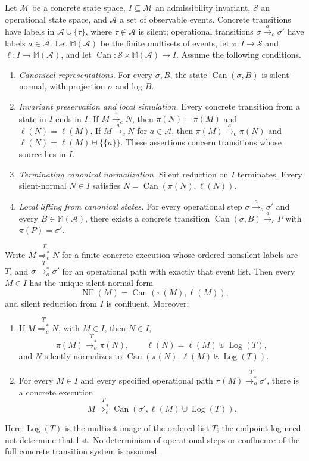 \begin{adequacyprinciple}
Let $\mathcal M$ be a concrete state space, $I\subseteq\mathcal M$ an
admissibility invariant, $\mathcal S$ an operational state space, and
$\mathcal A$ a set of observable events. Concrete transitions have labels
in $\mathcal A\cup\{\tau\}$, where $\tau\notin\mathcal A$ is silent;
operational transitions $\sigma\xrightarrow{a}_o\sigma'$ have labels
$a\in\mathcal A$. Let $\mathbb M(\mathcal A)$ be the finite multisets of
events, let $\pi:I\to\mathcal S$ and
$\ell:I\to\mathbb M(\mathcal A)$, and let
$\operatorname{Can}:\mathcal S\times\mathbb M(\mathcal A)\to I$.
Assume the following conditions.
\begin{enumerate}[label=(\arabic*),leftmargin=*]
\item \emph{Canonical representations.}
For every $\sigma,B$, the state $\operatorname{Can}(\sigma,B)$ is
silent-normal, with projection $\sigma$ and log $B$.
\item \emph{Invariant preservation and local simulation.}
Every concrete transition from a state in $I$ ends in $I$.
If $M\xrightarrow{\tau}_cN$, then $\pi(N)=\pi(M)$ and
$\ell(N)=\ell(M)$. If $M\xrightarrow{a}_cN$ for $a\in\mathcal A$, then
$\pi(M)\xrightarrow{a}_o\pi(N)$ and
$\ell(N)=\ell(M)\uplus\{\!\{a\}\!\}$.
These assertions concern transitions whose source lies in $I$.
\item \emph{Terminating canonical normalization.}
Silent reduction on $I$ terminates. Every silent-normal $N\in I$
satisfies $N=\operatorname{Can}(\pi(N),\ell(N))$.
\item \emph{Local lifting from canonical states.}
For every operational step $\sigma\xrightarrow{a}_o\sigma'$ and every
$B\in\mathbb M(\mathcal A)$, there exists a concrete transition
$\operatorname{Can}(\sigma,B)\xrightarrow{a}_cP$ with $\pi(P)=\sigma'$.
\end{enumerate}
Write $M\overset{T}{\Longrightarrow_c^*}N$ for a finite concrete
execution whose ordered nonsilent labels are $T$, and
$\sigma\overset{T}{\longrightarrow_o^*}\sigma'$ for an operational path
with exactly that event list. Then every $M\in I$ has the unique silent
normal form
\[
 \operatorname{NF}(M)=\operatorname{Can}(\pi(M),\ell(M)),
\]
and silent reduction from $I$ is confluent. Moreover:
\begin{enumerate}[label=(\roman*),leftmargin=*]
\item If $M\overset{T}{\Longrightarrow_c^*}N$, with $M\in I$, then
$N\in I$,
\[
 \pi(M)\overset{T}{\longrightarrow_o^*}\pi(N),\qquad
 \ell(N)=\ell(M)\uplus\operatorname{Log}(T),
\]
and $N$ silently normalizes to
$\operatorname{Can}(\pi(N),\ell(M)\uplus\operatorname{Log}(T))$.
\item For every $M\in I$ and every specified operational path
$\pi(M)\overset{T}{\longrightarrow_o^*}\sigma'$, there is a concrete
execution
\[
 M\overset{T}{\Longrightarrow_c^*}
 \operatorname{Can}(\sigma',\ell(M)\uplus\operatorname{Log}(T)).
\]
\end{enumerate}
Here $\operatorname{Log}(T)$ is the multiset image of the ordered list $T$;
the endpoint log need not determine that list. No determinism of operational
steps or confluence of the full concrete transition system is assumed.
\end{adequacyprinciple}
